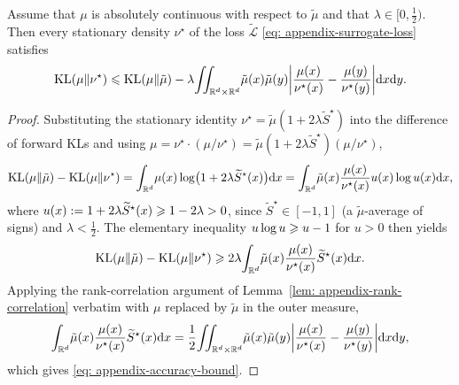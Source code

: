 \documentclass{article}
\begin{document}
\begin{theorem}
\label{thm: appendix-accuracy}
Assume that $\mu$ is absolutely continuous with respect to $\tilde\mu$ and that $\lambda \in [0, \frac12)$. Then every stationary density $\nu^\star$ of the loss $\widetilde{\mathcal L}$ \eqref{eq: appendix-surrogate-loss} satisfies
\begin{equation}
    \mathrm{KL}(\mu\|\nu^\star) \leqslant \mathrm{KL}(\mu\|\tilde\mu) - \lambda\!\iint_{\mathbb R^d\times\mathbb R^d}\!\tilde\mu(x)\tilde\mu(y) \biggl|\frac{\mu(x)}{\nu^\star(x)} - \frac{\mu(y)}{\nu^\star(y)}\biggr| \mathrm{d} x \mathrm{d} y.
    \label{eq: appendix-accuracy-bound}
\end{equation}
\end{theorem}

\begin{proof}
Substituting the stationary identity $\nu^\star = \tilde\mu(1+2\lambda\widetilde S^\star)$ into the difference of forward KLs and using $\mu = \nu^\star \cdot (\mu/\nu^\star) = \tilde\mu(1+2\lambda\widetilde S^\star)(\mu/\nu^\star)$,
\begin{equation*}
    \mathrm{KL}(\mu\|\tilde\mu) - \mathrm{KL}(\mu\|\nu^\star)
    = \int_{\mathbb R^d}\!\mu(x)\log\bigl(1 + 2\lambda\widetilde S^\star(x)\bigr)\mathrm{d} x
    = \int_{\mathbb R^d}\!\tilde\mu(x) \frac{\mu(x)}{\nu^\star(x)}u(x)\log u(x)\mathrm{d} x,
\end{equation*}
where $u(x) := 1 + 2\lambda\widetilde S^\star(x) \geqslant 1 - 2\lambda > 0$, since $\widetilde S^\star \in [-1, 1]$ (a $\tilde\mu$-average of signs) and $\lambda < \frac12$. The elementary inequality $u\log u \geqslant u - 1$ for $u > 0$ then yields
\begin{equation*}
    \mathrm{KL}(\mu\|\tilde\mu) - \mathrm{KL}(\mu\|\nu^\star)
    \geqslant 2\lambda\!\int_{\mathbb R^d}\!\tilde\mu(x) \frac{\mu(x)}{\nu^\star(x)} \widetilde S^\star(x)\mathrm{d} x.
\end{equation*}
Applying the rank-correlation argument of Lemma~\ref{lem: appendix-rank-correlation} verbatim with $\mu$ replaced by $\tilde\mu$ in the outer measure,
\begin{equation*}
    \int_{\mathbb R^d}\!\tilde\mu(x)\frac{\mu(x)}{\nu^\star(x)}\widetilde S^\star(x)\mathrm{d} x = \frac{1}{2}\!\iint_{\mathbb R^d\times\mathbb R^d}\!\tilde\mu(x)\tilde\mu(y) \biggl|\frac{\mu(x)}{\nu^\star(x)} - \frac{\mu(y)}{\nu^\star(y)}\biggr|\mathrm{d} x\mathrm{d} y,
\end{equation*}
which gives \eqref{eq: appendix-accuracy-bound}.
\end{proof}
\end{document}
